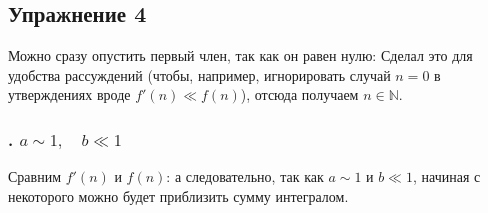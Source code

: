 \def \picdir{pic/}

\subsection*{Упражнение 4}
Можно сразу опустить первый член, так как он равен нулю:
Сделал это для удобства рассуждений (чтобы, например, игнорировать случай $n = 0$ в утверждениях вроде $f'(n) \ll f(n)$), отсюда получаем $n \in \mathbb{N}$.
\subsubsection*{. $a \sim 1,\quad b \ll 1$}
Сравним $f'(n)$ и $f(n)$:
а следовательно, так как $a \sim 1$ и $b \ll 1$, начиная с некоторого
можно будет приблизить сумму интегралом.

